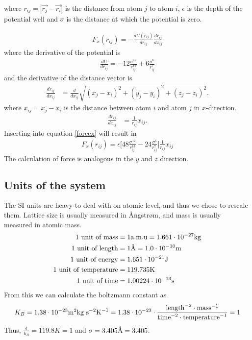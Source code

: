 \documentclass{article}
\begin{document}
where $r_{ij}=|\vec{r_j}-\vec{r_i}|$ is the distance from atom $j$ to atom $i$, $\epsilon$ is the depth of the potential well and $\sigma$ is the distance at which the potential is zero.

\begin{align}
	F_x(r_{ij}) = - \frac{dU(r_{ij})}{dr_{ij}}\frac{dr_{ij}}{dx_{ij}}
	\label{forcex}
\end{align}
where the derivative of the potential is
\begin{align}
	\frac{dU}{dr_{ij}}=-12\frac{\sigma^{12}}{r_{ij}^{13}} + 6 \frac{\sigma^6}{r_{ij}^7}
\end{align}
and the derivative of the distance vector is
\begin{align}
	\frac{dr_{ij}}{dx_{ij}}&=\frac{d}{dx_{ij}}\sqrt{(x_j-x_i)^2+(y_j-y_i)^2+(z_j-z_i)^2}.
\end{align}
where $x_{ij}=x_j-x_i$ is the distance between atom $i$ and atom $j$ in $x$-direction.
\begin{align}
	\frac{dr_{ij}}{dx_{ij}}&=\frac{1}{r_{ij}}x_{ij}.
\end{align}
Inserting into equation \ref{forcex} will result in
\begin{align}
	F_x(r_{ij})= \epsilon \Big[48\frac{\sigma^{12}}{r_{ij}^{13}} - 24 \frac{\sigma^6}{r_{ij}^7}\Big]\frac{1}{r_{ij}}x_{ij}
\end{align}
The calculation of force is analogous in the $y$ and $z$ direction.


\subsection{Units of the system}

The SI-units are heavy to deal with on atomic level, and thus we chose to rescale them. Lattice size is usually measured in Ångstrøm, and mass is usually measured in atomic mass.
\begin{align}
	1 \textnormal{ unit of mass} &= 1 \textnormal{a.m.u} = 1.661\cdot 10^{-27} \textnormal{kg}\\
	1 \textnormal{ unit of length} &= 1 \textnormal{Å} = 1.0\cdot 10^{-10} \textnormal{m}\\
	1 \textnormal{ unit of energy} &= 1.651\cdot 10^{-21}\textnormal{J}\\
	1 \textnormal{ unit of temperature} &= 119.735\textnormal{K}\\
	1 \textnormal{ unit of time} &= 1.00224\cdot 10^{-13} \textnormal{s}
\end{align}
From this we can calculate the boltzmann constant as
\begin{align}
	K_B = 1.38\cdot 10^{-23} \textnormal{m}^2\textnormal{kg}\textnormal{ s}^{-2}\textnormal{K}^{-1}= 1.38\cdot 10^{-23} \cdot \frac{\textnormal{length}^{-2}\cdot\textnormal{mass}^{-1}}{\textnormal{time}^{-2}\cdot\textnormal{temperature}^{-1}}=1
\end{align}
Thus, $\frac{\epsilon}{k_B}=119.8K=1$ and $\sigma = 3.405 \textnormal{Å}= 3.405$.
\end{document}
